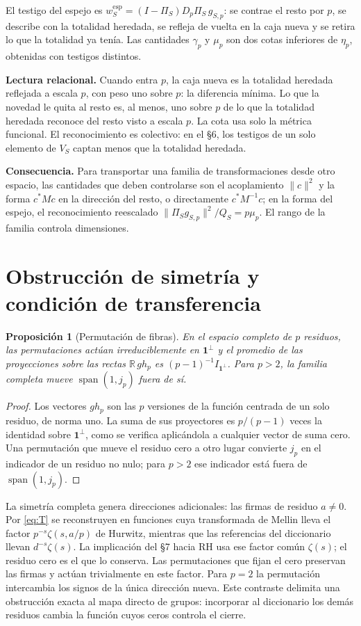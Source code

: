 \documentclass[11pt,a4paper]{article}
\theoremstyle{plain}
\newtheorem{proposicion}{Proposición}
\newcommand{\R}{\mathbb{R}}
\newcommand{\spn}{\operatorname{span}}
\begin{document}
El testigo del espejo es $w_S^{\mathrm{esp}}=(I-\Pi_S)D_p\Pi_S\,g_{S,p}$: se contrae el resto por $p$, se describe con la totalidad heredada, se refleja de vuelta en la caja nueva y se retira lo que la totalidad ya tenía. Las cantidades $\gamma_p$ y $\mu_p$ son dos cotas inferiores de $\eta_p$, obtenidas con testigos distintos.

\textbf{Lectura relacional.} Cuando entra $p$, la caja nueva es la totalidad heredada reflejada a escala $p$, con peso uno sobre $p$: la diferencia mínima. Lo que la novedad le quita al resto es, al menos, uno sobre $p$ de lo que la totalidad heredada reconoce del resto visto a escala $p$. La cota usa solo la métrica funcional. El reconocimiento es colectivo: en el §6, los testigos de un solo elemento de $V_S$ captan menos que la totalidad heredada.

\textbf{Consecuencia.} Para transportar una familia de transformaciones desde otro espacio, las cantidades que deben controlarse son el acoplamiento $\|c\|^2$ y la forma $c^*Mc$ en la dirección del resto, o directamente $c^*M^{-1}c$; en la forma del espejo, el reconocimiento reescalado $\|\Pi_Sg_{S,p}\|^2/Q_S=p\mu_p$. El rango de la familia controla dimensiones.

\section{Obstrucción de simetría y condición de transferencia}

\begin{proposicion}[Permutación de fibras]\label{prop:perm}
En el espacio completo de $p$ residuos, las permutaciones actúan irreduciblemente en $\mathbf 1^\perp$ y el promedio de las proyecciones sobre las rectas $\R\,gh_p$ es $(p-1)^{-1}I_{\mathbf 1^\perp}$. Para $p>2$, la familia completa mueve $\spn(1,j_p)$ fuera de sí.
\end{proposicion}

\begin{proof}
Los vectores $gh_p$ son las $p$ versiones de la función centrada de un solo residuo, de norma uno. La suma de sus proyectores es $p/(p-1)$ veces la identidad sobre $\mathbf 1^\perp$, como se verifica aplicándola a cualquier vector de suma cero. Una permutación que mueve el residuo cero a otro lugar convierte $j_p$ en el indicador de un residuo no nulo; para $p>2$ ese indicador está fuera de $\spn(1,j_p)$.
\end{proof}

La simetría completa genera direcciones adicionales: las firmas de residuo $a\neq 0$. Por \eqref{eq:T} se reconstruyen en funciones cuya transformada de Mellin lleva el factor $p^{-s}\zeta(s,a/p)$ de Hurwitz, mientras que las referencias del diccionario llevan $d^{-s}\zeta(s)$. La implicación del §7 hacia RH usa ese factor común $\zeta(s)$; el residuo cero es el que lo conserva. Las permutaciones que fijan el cero preservan las firmas y actúan trivialmente en este factor. Para $p=2$ la permutación intercambia los signos de la única dirección nueva. Este contraste delimita una obstrucción exacta al mapa directo de grupos: incorporar al diccionario los demás residuos cambia la función cuyos ceros controla el cierre.
\end{document}
